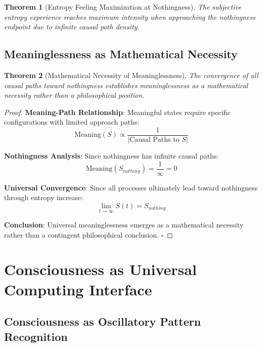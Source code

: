 \documentclass[11pt,a4paper]{article}
\newtheorem{theorem}{Theorem}[section]
\theoremstyle{remark}
\begin{document}
\begin{theorem}[Entropy Feeling Maximization at Nothingness]
The subjective entropy experience reaches maximum intensity when approaching the nothingness endpoint due to infinite causal path density.
\end{theorem}

\subsection{Meaninglessness as Mathematical Necessity}

\begin{theorem}[Mathematical Necessity of Meaninglessness]
The convergence of all causal paths toward nothingness establishes meaninglessness as a mathematical necessity rather than a philosophical position.
\end{theorem}

\begin{proof}
\textbf{Meaning-Path Relationship}: Meaningful states require specific configurations with limited approach paths:
\begin{equation}
\text{Meaning}(S) \propto \frac{1}{|\text{Causal Paths to } S|}
\end{equation}

\textbf{Nothingness Analysis}: Since nothingness has infinite causal paths:
\begin{equation}
\text{Meaning}(S_{nothing}) = \frac{1}{\infty} = 0
\end{equation}

\textbf{Universal Convergence}: Since all processes ultimately lead toward nothingness through entropy increase:
\begin{equation}
\lim_{t \to \infty} S(t) = S_{nothing}
\end{equation}

\textbf{Conclusion}: Universal meaninglessness emerges as a mathematical necessity rather than a contingent philosophical conclusion. $\square$
\end{proof}

\section{Consciousness as Universal Computing Interface}

\subsection{Consciousness as Oscillatory Pattern Recognition}
\end{document}
